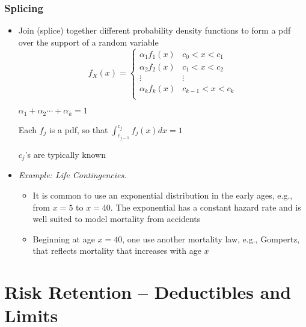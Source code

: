 \documentclass{beamer}
\begin{document}
\begin{frame}[shrink=2]
\frametitle{Splicing}
\begin{itemize}
\item Join (splice) together different probability density functions to form a pdf over the support of a random
variable \vspace{2mm}
\[
f_X (x)=\left\{
\begin{array}{ll}
\alpha_1 f_1 (x) & c_0  < x < c_1  \\
\alpha_2 f_2 (x) & c_1  < x < c_2  \\
\vdots & \vdots \\
\alpha_{k}f_{k}(x) & c_{k-1} < x < c_{k}  \\%
\end{array}%
\right.
\]%

$\alpha_1  + \alpha_2  \cdots + \alpha_{k} = 1$\\ \vspace{2mm}

Each $f_j$ is a pdf, so that $\int_{c_{j-1}}^{c_{j}}f_{j}(x)dx =
1$\\ \vspace{2mm}

$c_{j}$'s are typically known\\ \vspace{2mm}

\item \textit{Example: Life Contingencies}.
\begin{itemize}\item It is common to use an exponential distribution in the early ages, e.g., from $x=5$ to $x=40$. The exponential has a constant hazard rate and is well suited to model mortality from
accidents \vspace{2mm}

\item Beginning at age $x=40$, one use another mortality law, e.g., Gompertz, that reflects mortality that increases with age $x$
\end{itemize}\end{itemize}
\end{frame}


\section{Risk Retention -- Deductibles and Limits}
\end{document}
